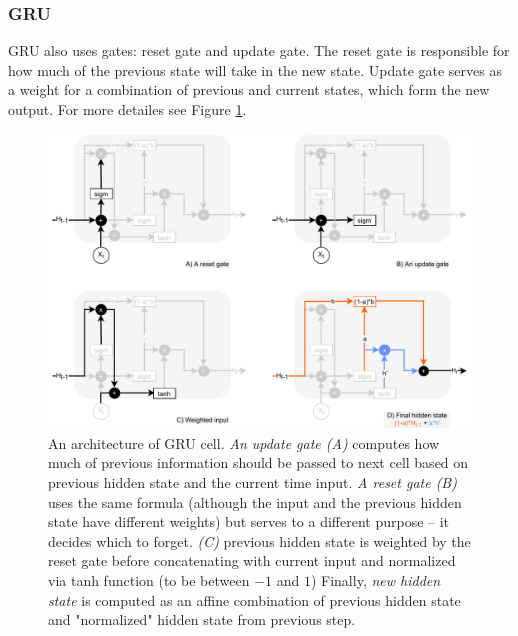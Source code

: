 \subsubsection*{GRU}
GRU also uses gates: reset gate and update gate.
The reset gate is responsible for how much of the previous state will take in the new state. Update gate serves as a weight for a combination of previous and current states, which form the new output. For more detailes see Figure \ref{pic:gru_gates}.
\begin{figure}[ht]
\centering
\includegraphics[width=1\columnwidth]{../img/gru_gates}
\protect\caption{An architecture of GRU cell. \textit{An update gate (A)} computes how much of previous information should be passed to next cell based on previous hidden state and the current time input. \textit{A reset gate (B)} uses the same formula (although the input and the previous hidden state have different weights) but serves to a different purpose -- it decides which to forget. \textit{(C)} previous hidden state is weighted by the reset gate before concatenating with current input and normalized via tanh function (to be between $-1$ and $1$) Finally, \textit{new hidden state} is computed as an affine combination of previous hidden state and "normalized" hidden state from previous step.}
\label{pic:gru_gates}
\end{figure}
